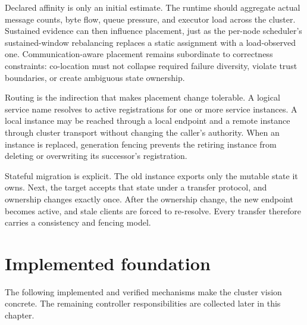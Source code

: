 Declared affinity is only an initial estimate. The runtime should aggregate
actual message counts, byte flow, queue pressure, and executor load across
the cluster. Sustained evidence can then influence placement, just as the
per-node scheduler's sustained-window rebalancing replaces a static
assignment with a load-observed one. Communication-aware placement remains
subordinate to correctness constraints: co-location must not collapse
required failure diversity, violate trust boundaries, or create ambiguous
state ownership.

Routing is the indirection that makes placement change tolerable. A logical
service name resolves to active registrations for one or more service instances.
A local instance may be reached through a local endpoint and a remote instance
through cluster transport without changing the caller's authority. When an
instance is replaced, generation fencing prevents the retiring instance from deleting or
overwriting its successor's registration.

Stateful migration is explicit. The old instance exports only the mutable state it
owns. Next, the target accepts that state under a transfer protocol, and ownership
changes exactly once. After the ownership change, the new endpoint becomes
active, and stale clients are forced to re-resolve. Every transfer therefore carries
a consistency and fencing model.

\section{Implemented foundation}

The following implemented and verified mechanisms make the cluster vision
concrete. The remaining controller responsibilities are collected later in
this chapter.

